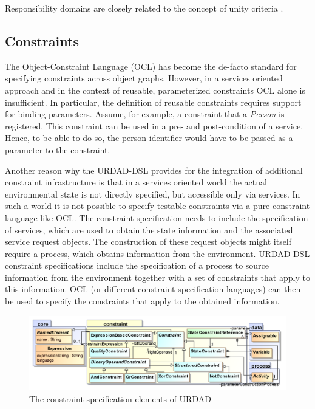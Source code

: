 Responsibility domains are closely related to the concept of unity criteria \cite{gonzalez_unity_2009}.


\subsection{Constraints}

The Object-Constraint Language (OCL) has become the de-facto standard for specifying constraints across object graphs. However, in a services oriented approach and in the context of reusable, parameterized constraints OCL alone is insufficient. In particular, the definition of reusable constraints requires support for binding parameters. Assume, for example, a constraint that a \emph{Person} is registered. This constraint can be used in a pre- and post-condition of a service. Hence, to be able to do so, the person identifier would have to be passed as a parameter to the constraint.

Another reason why the URDAD-DSL provides for the integration of additional constraint infrastructure is that in a services oriented world the actual environmental state is not directly specified, but accessible only via services. In such a world it is not possible to specify testable constraints via a pure constraint language like OCL. The constraint specification needs to include the specification of services, which are used to obtain the state information and the associated service request objects. The construction of these request objects might itself require a process, which obtains information from the environment. URDAD-DSL constraint specifications include the specification of a process to source information from the environment together with a set of constraints that apply to this information. OCL (or different constraint specification languages) can then be used to specify the constraints that apply to the obtained information.

\begin{figure}[Htbp]
  \centering
  \includegraphics{constraint}
  \caption{The constraint specification elements of URDAD}
  \label{fig:metamodel}
\end{figure}


